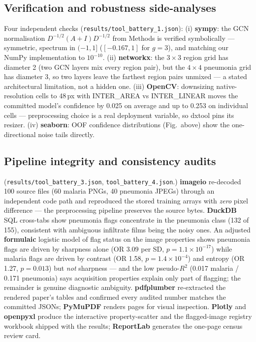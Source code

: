 \subsection{Verification and robustness side-analyses}
Four independent checks (\texttt{results/tool\_battery\_1.json}):
(i) \textbf{sympy}: the GCN normalisation $D^{-1/2}(A{+}I)D^{-1/2}$ from
Methods is verified symbolically --- symmetric, spectrum in $({-1},1]$
($[-0.167,1]$ for $g{=}3$), and matching our NumPy implementation to
$10^{-10}$. (ii) \textbf{networkx}: the $3{\times}3$ region grid has
diameter 2 (two GCN layers mix every region pair), but the $4{\times}4$
pneumonia grid has diameter 3, so two layers leave the farthest region
pairs unmixed --- a stated architectural limitation, not a hidden one.
(iii) \textbf{OpenCV}: downsizing native-resolution cells to 48\,px with
INTER\_AREA vs INTER\_LINEAR moves the committed model's confidence by
0.025 on average and up to 0.253 on individual cells --- preprocessing
choice is a real deployment variable, so dxtool pins its resizer.
(iv) \textbf{seaborn}: OOF confidence distributions (Fig.~above) show
the one-directional noise tails directly.
\subsection{Pipeline integrity and consistency audits}
(\texttt{results/tool\_battery\_3.json}, \texttt{tool\_battery\_4.json}.)
\textbf{imageio} re-decoded 100 source files (60 malaria PNGs, 40
pneumonia JPEGs) through an independent code path and reproduced the
stored training arrays with \emph{zero} pixel difference --- the
preprocessing pipeline preserves the source bytes. \textbf{DuckDB} SQL
cross-tabs show pneumonia flags concentrate in the pneumonia class
(132 of 155), consistent with ambiguous infiltrate films being the noisy
ones. An adjusted \textbf{formulaic} logistic model of flag status on
the image properties shows pneumonia flags are driven by sharpness alone
(OR 3.09 per SD, $p{=}1.1{\times}10^{-17}$) while malaria flags are
driven by contrast (OR 1.58, $p{=}1.4{\times}10^{-4}$) and entropy
(OR 1.27, $p{=}0.013$) but \emph{not} sharpness --- and the low
pseudo-$R^2$ (0.017 malaria / 0.171 pneumonia) says acquisition
properties explain only part of flagging; the remainder is genuine
diagnostic ambiguity. \textbf{pdfplumber} re-extracted the rendered
paper's tables and confirmed every audited number matches the committed
JSONs; \textbf{PyMuPDF} renders pages for visual inspection.
\textbf{Plotly} and \textbf{openpyxl} produce the interactive
property-scatter and the flagged-image registry workbook shipped with
the results; \textbf{ReportLab} generates the one-page census review
card.

